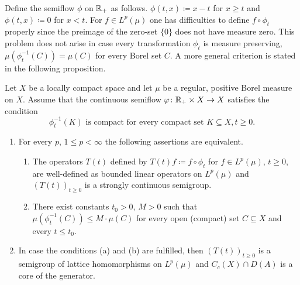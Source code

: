 Define the semiflow $\phi$ on $\mathbb{R} _+$ as follows. 
$\phi(t,x) \coloneq  x-t$ for $x \geq t$ and $\phi(t,x) \coloneq  0$ for $x < t$. 
For $f \in L^p(\mu)$ one has difficulties to define $f \circ \phi_t$ properly since the preimage of the zero-set $\{0\}$ does
not have measure zero. This problem does not arise in case every
transformation $\phi_t$ is measure preserving, \ie  $\mu(\phi_t^{-1}(C)) = \mu(C)$
for every Borel set $C$. A more general criterion is stated in the
following proposition.
\begin{proposition}\label{prop:c3-4.11}
Let $X$ be a locally compact space and let $\mu$ be a
regular, positive Borel measure on $X$. Assume that the continuous
semiflow $\phi \colon \R _+ \times X \to X$ satisfies the condition
\begin{equation}\label{eq:c3-4.12}
	\phi_t^{-1}(K)  \text{ is compact for every compact set }  K \subseteq X , t \geq 0 .
\end{equation}
\begin{enumerate}[\upshape (i)]
\item		
For every $p$, $1 \leq p < \infty$ the following assertions are equivalent.
\begin{enumerate}[\upshape (a)]
\item
The operators $T(t)$ defined by $T(t)f \coloneq  f \circ \phi_t$ for $f \in L^p(\mu)$, $t \geq 0$, are well-defined as bounded linear operators on $L^p(\mu)$ and $(T(t))_{t \geq 0}$ is a strongly continuous semigroup.
			
\item 
There exist constants $t_0 > 0$, $M > 0$ such that $\mu(\phi_t^{-1}(C)) \leq M \cdot \mu(C)$ for every open (compact) set $C \subseteq X$ and every $t \leq t_0$.
\end{enumerate}
	
\item 
In case the conditions (a) and (b) are fulfilled, then $(T(t))_{t \geq 0}$ is a semigroup of lattice homomorphisms on $L^p(\mu)$ and $C_c(X) \cap D(A)$ is a core%
of the generator.
\end{enumerate}
\end{proposition}
